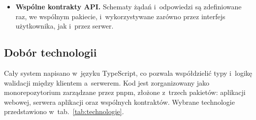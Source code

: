 \begin{itemize}
  \item \textbf{Wspólne kontrakty API.} Schematy żądań i~odpowiedzi są zdefiniowane raz, we wspólnym pakiecie, i~wykorzystywane zarówno przez interfejs użytkownika, jak i~przez serwer.
\end{itemize}

\subsection{Dobór technologii}

Cały system napisano w~języku TypeScript, co pozwala współdzielić typy i~logikę walidacji między klientem a~serwerem. Kod jest zorganizowany jako monorepozytorium zarządzane przez pnpm, złożone z~trzech pakietów: aplikacji webowej, serwera aplikacji oraz wspólnych kontraktów. Wybrane technologie przedstawiono w~tab.~\ref{tab:technologie}.

